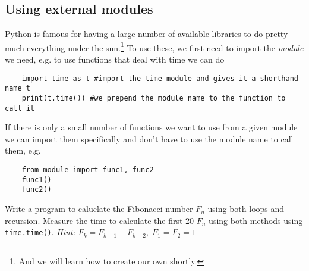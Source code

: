 \subsection{Using external modules}
Python is famous for having a large number of available libraries to do pretty much everything under the sun.\footnote{And we will learn how to create our own shortly.} To use these, we first need to import the \emph{module} we need, e.g. to use functions that deal with time we can do
\begin{lstlisting}
    import time as t #import the time module and gives it a shorthand name t
    print(t.time()) #we prepend the module name to the function to call it
\end{lstlisting}
If there is only a small number of functions we want to use from a given module we can import them specifically and don't have to use the module name to call them, e.g.
\begin{lstlisting}
    from module import func1, func2
    func1()
    func2()
\end{lstlisting}

\begin{exercise}
    Write a program to caluclate the Fibonacci number $F_n$ using both loops and recursion. Measure the time to calculate the first 20 $F_n$ using both methods using \verb|time.time()|.
    \emph{Hint:} $F_k = F_{k-1} + F_{k-2},\;F_1 = F_2 = 1$
\end{exercise}